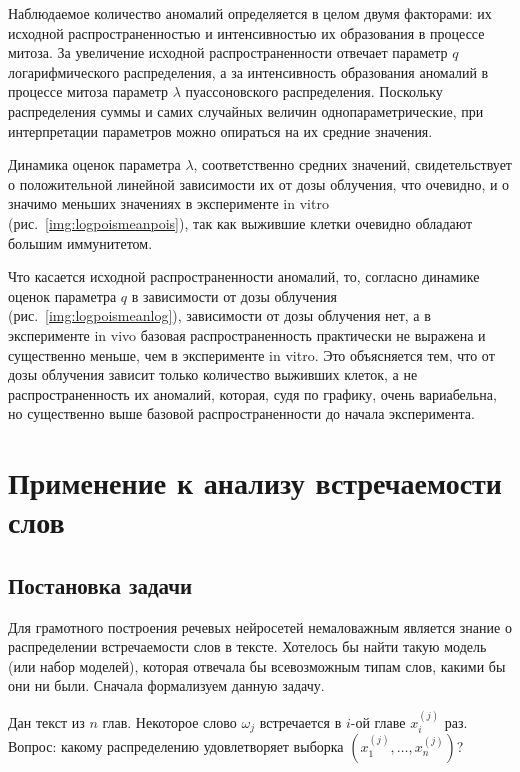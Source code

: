 \documentclass[12pt, specialist, subf, substylefile = spbu.rtx]{disser}
\begin{document}
	Наблюдаемое количество аномалий определяется в целом двумя факторами: их исходной распространенностью и интенсивностью их образования в процессе митоза. За увеличение исходной  распространенности отвечает параметр $q$ логарифмического распределения, а за интенсивность образования аномалий в процессе митоза параметр $\lambda$  пуассоновского распределения. Поскольку распределения  суммы и самих случайных величин однопараметрические, при интерпретации  параметров можно опираться на их средние значения.
	
	Динамика оценок параметра $\lambda$,  соответственно средних значений, свидетельствует о положительной линейной зависимости их от дозы облучения, что очевидно, и о значимо меньших значениях в эксперименте in vitro (рис.~\ref{img:logpoismeanpois}), так как выжившие клетки очевидно обладают большим иммунитетом. 
	
	Что касается исходной распространенности аномалий, то, согласно динамике оценок параметра $q$  в зависимости от дозы облучения (рис.~\ref{img:logpoismeanlog}), зависимости от дозы облучения нет, а в эксперименте in vivo базовая распространенность практически не выражена и существенно меньше, чем в эксперименте in vitro. Это объясняется тем, что от дозы облучения зависит только количество выживших клеток, а не распространенность их аномалий, которая, судя по графику,   очень вариабельна, но существенно выше базовой распространенности до начала эксперимента.
	
	\chapter{Применение к анализу встречаемости слов}
	
	\label{textanalysis}
	
	\section{Постановка задачи}
	
	Для грамотного построения речевых нейросетей немаловажным является знание о распределении встречаемости слов в тексте. Хотелось бы найти такую модель (или набор моделей), которая отвечала бы всевозможным типам слов, какими бы они ни были. Сначала формализуем данную задачу.
	
	Дан текст из $ n $ глав. Некоторое слово $ \omega _j $ встречается в $ i $-ой главе $ x ^{(j)} _i $ раз. Вопрос: какому распределению удовлетворяет выборка $ (x ^{(j)} _1, \dots, x ^{(j)} _n) $?
	
\end{document}
